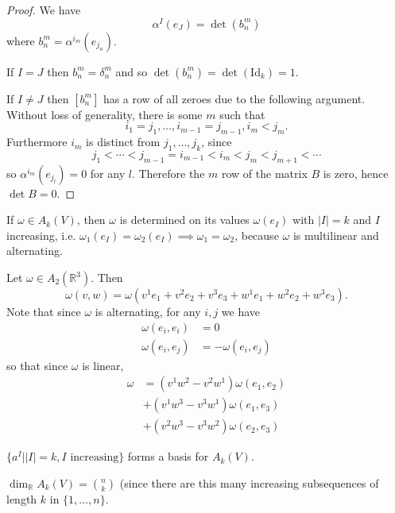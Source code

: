 \begin{proof}
We have
$$
\alpha^I(e_J) = \det(b_n^m)
$$
where $b_n^m = \alpha^{i_m}(e_{j_n})$.

If $I = J$ then $b_n^m = \delta_n^m$ and so
$\det (b_n^m) = \det(\mathrm{Id}_k) = 1$.

If $I \neq J$ then $[b_n^m]$ has a row of all zeroes due to the
following argument. Without loss of
generality, there is some $m$ such that
$$
i_1 = j_1, \dots, i_{m-1} = j_{m-1}, i_m < j_m.
$$
Furthermore $i_m$ is distinct from $j_1, \dots, j_k$, since
$$
j_1 < \cdots < j_{m-1} = i_{m-1} < i_m < j_m < j_{m+1} < \cdots
$$
so $\alpha^{i_m}(e_{j_l}) = 0$ for any $l$. Therefore the $m$ row of
the matrix $B$ is zero, hence $\det B = 0$.
\end{proof}

\begin{remark}
If $\omega \in A_k(V)$, then $\omega$ is determined on its values
$\omega(e_I)$ with $|I| = k$ and $I$ increasing, i.e.
$\omega_1(e_I) = \omega_2(e_I) \implies \omega_1 = \omega_2$,
because $\omega$ is multilinear and alternating.

\begin{xmpl}
Let $\omega \in A_2(\mathbb{R}^3)$. Then
$$
  \omega(v, w)
= \omega(v^1 e_1 + v^2 e_2 + v^3 e_3 +
         w^1 e_1 + w^2 e_2 + w^3 e_3).
$$
Note that since $\omega$ is alternating, for any $i, j$ we have
\begin{align*}
  \omega(e_i, e_i) &= 0 \\
  \omega(e_i, e_j) &= -\omega(e_i, e_j)
\end{align*}
so that since $\omega$ is linear,
\begin{align*}
   \omega
&= (v^1 w^2 - v^2 w^1)\omega(e_1, e_2) \\
&+ (v^1 w^3 - v^3 w^1)\omega(e_1, e_3) \\
&+ (v^2 w^3 - v^3 w^2)\omega(e_2, e_3)
\end{align*}
\end{xmpl}
\end{remark}

\begin{prop}
$\{ a^I | |I| = k, I \text{ increasing}\}$ forms a basis for $A_k(V)$.
\end{prop}
\begin{corol}
$\dim_{\mathbb{R}} A_k(V) = {n \choose k}$ (since there are this many
increasing subsequences of length $k$ in $\{1, \dots, n\}$.
\end{corol}

